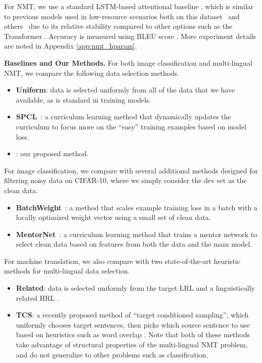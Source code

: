 For NMT, we use a standard LSTM-based attentional baseline \citep{attention}, which is similar to previous models used in low-resource scenarios both on this dataset~\citep{rapid_adapt_nmt,sde} and others~\citep{lownmt19} due to its relative stability compared to other options such as the Transformer \citep{vaswani2017attention}. Accuracy is measured using BLEU score \citep{bleu}.
More experiment details are noted in Appendix \ref{app:nmt_hparam}.

\noindent \textbf{Baselines and Our Methods.}
For both image classification and multi-lingual NMT, we compare the following data selection methods.
\begin{itemize}
\item \textbf{Uniform}: data is selected uniformly from all of the data that we have available, as is standard in training models. 
\item \textbf{SPCL}~\citep{spcl}: a curriculum learning method that dynamically updates the curriculum to focus more on the ``easy'' training examples based on model loss.
\item \textbf{\dds}: our proposed method.
\end{itemize}

For image classification, we compare with several additional methods designed for filtering noisy data on CIFAR-10, where we simply consider the dev set as the clean data.
\begin{itemize}
\item \textbf{BatchWeight}~\citep{learn_reweight}: a method that scales example training loss in a batch with a locally optimized weight vector using a small set of clean data. 
\item  \textbf{MentorNet}~\citep{mentornet}: a curriculum learning method that trains a mentor network to select clean data based on features from both the data and the main model. 
\end{itemize}


For machine translation, we also compare with two state-of-the-art heuristic methods for multi-lingual data selection.
\begin{itemize}
\item \textbf{Related}: data is selected uniformly from the target LRL and a linguistically related HRL \citep{rapid_adapt_nmt}. 
\item  \textbf{TCS}: a recently proposed method of ``target conditioned sampling'', which uniformly chooses target sentences, then picks which source sentence to use based on heuristics such as word overlap \citep{TCS}.
Note that both of these methods take advantage of structural properties of the multi-lingual NMT problem, and do not generalize to other problems such as classification.
\end{itemize}

